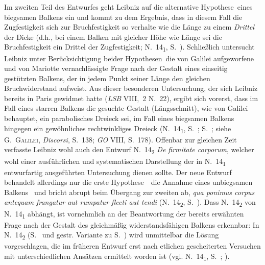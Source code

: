 Im zweiten Teil des Entwurfes %
geht Leibniz auf die alternative \glqq Hypothese\grqq\ eines biegsamen Balkens ein und kommt zu dem Ergebnis, dass in diesem Fall die Zugfestigkeit sich zur Bruchfestigkeit so verhalte wie die Länge zu einem \textit{Drittel} der Dicke (d.h., bei einem Balken mit gleicher Höhe wie Länge sei die Bruchfestigkeit ein Drittel der Zugfestigkeit; N.~14\textsubscript{1}, S.~).
Schließlich untersucht Leibniz unter Berücksichtigung beider \glqq Hypothesen\grqq\ die von Galilei aufgeworfene und von Mariotte vernachlässigte Frage nach der Gestalt eines einseitig gestützten Balkens, der in jedem Punkt seiner Länge den gleichen Bruchwiderstand aufweist.
Aus dieser besonderen Untersuchung, der sich Leibniz bereits in Paris gewidmet hatte (\textit{LSB} VIII,~2 N.~22\cite{01252}), ergibt sich vorerst, dass im Fall eines starren Balkens die gesuchte Gestalt (Längsschnitt), wie von Galilei behauptet, ein parabolisches Dreieck sei, im Fall eines biegsamen Balkens hingegen ein gewöhnliches rechtwinkliges Dreieck (N.~14\textsubscript{1}, S.~; S.~; siehe G.~\textsc{Galilei}, \cite{00050}\textit{Discorsi}, S.~138;\cite{00050} \textit{GO} VIII, S.~178\cite{00048}).
\pend%
\pstart%
Offenbar zur gleichen Zeit verfasste Leibniz wohl auch den Entwurf N.~14\textsubscript{2} \textit{De firmitate corporum}, welcher wohl einer ausführlichen und systematischen Darstellung der in N.~14\textsubscript{1} entwurfartig ausgeführten Untersuchung dienen sollte.
Der neue Entwurf behandelt allerdings nur die erste \glqq Hypothese\grqq\ \textendash\ die Annahme eines unbiegsamen Balkens \textendash\ und bricht abrupt beim Übergang zur zweiten ab, \textit{qua ponimus corpus antequam frangatur aut rumpatur flecti aut tendi} (N.~14\textsubscript{2},
S.~).
Dass N.~14\textsubscript{2} von N.~14\textsubscript{1} abhängt, ist vornehmlich an der Beantwortung der bereits erwähnten Frage nach der Gestalt des gleichmäßig widerstandsfähigen Balkens erkennbar:
In N.~14\textsubscript{2} (S.~ und gestr. Variante zu S.~) wird unmittelbar die Lösung vorgeschlagen, die im früheren Entwurf erst nach etlichen gescheiterten Versuchen mit unterschiedlichen Ansätzen ermittelt worden ist (vgl. N.~14\textsubscript{1}, S.~; ).
